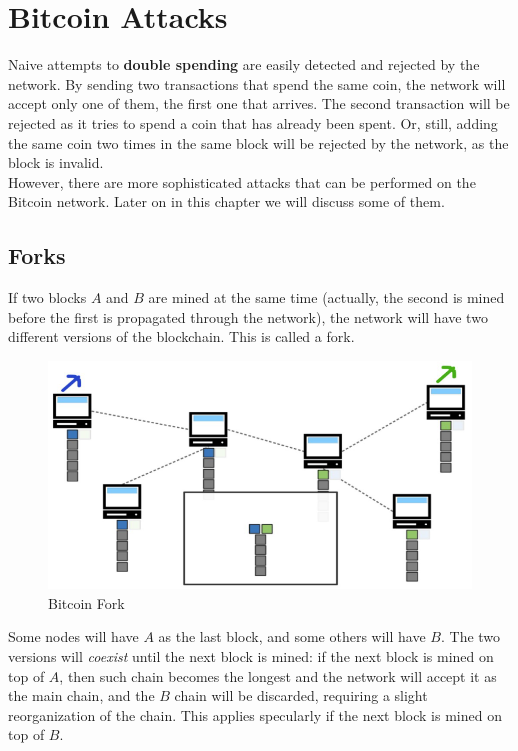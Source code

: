 \chapter{Bitcoin Attacks}

Naive attempts to \textbf{double spending} are easily detected and rejected by the network.
By sending two transactions that spend the same coin, the network will accept only one of them, the first one that arrives. The second transaction will be rejected as it tries to spend a coin that has already been spent.
Or, still, adding the same coin two times in the same block will be rejected by the network, as the block is invalid.\\
However, there are more sophisticated attacks that can be performed on the Bitcoin network. Later on in this chapter we will discuss some of them.

\section{Forks}
If two blocks $A$ and $B$ are mined at the same time (actually, the second is mined before the first is propagated through the network), the network will have two different versions of the blockchain. This is called a fork.
\begin{paracol}{2}
   \colfill	
   \begin{figure}[htbp]
      \centering
      \includegraphics{images/bitcoin_fork.png}
      \caption{Bitcoin Fork}
      \label{fig:bitcoin_fork}
   \end{figure}
   \colfill
   \switchcolumn
   Some nodes will have $A$ as the last block, and some others will have $B$. 
   The two versions will \textit{coexist} until the next block is mined: if the next block is mined on top of $A$, then such chain becomes the longest and the network will accept it as the main chain, and the $B$ chain will be discarded, requiring a slight reorganization of the chain. This applies specularly if the next block is mined on top of $B$.
\end{paracol}

